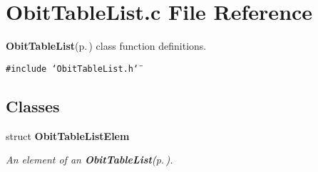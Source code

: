 \section{Obit\-Table\-List.c File Reference}
\label{ObitTableList_8c}
{\bf Obit\-Table\-List}{\rm (p.\,\pageref{structObitTableList})} class function definitions. 

{\tt \#include \char`\"{}Obit\-Table\-List.h\char`\"{}}\par
\subsection*{Classes}
\begin{CompactItemize}
\item 
struct {\bf Obit\-Table\-List\-Elem}
\begin{CompactList}\small\item\em An element of an {\bf Obit\-Table\-List}{\rm (p.\,\pageref{structObitTableList})}. \item\end{CompactList}\end{CompactItemize}
